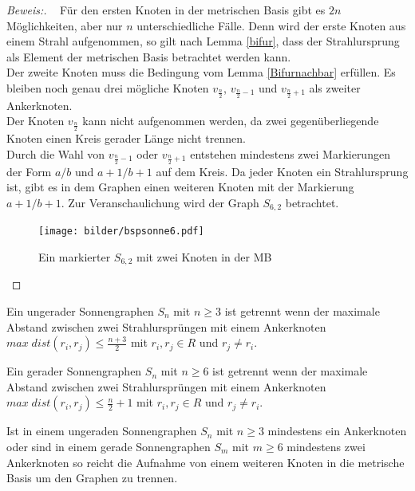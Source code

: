 \begin{proof}[Beweis:]~
Für den ersten Knoten in der metrischen Basis gibt es $2n$ Möglichkeiten, aber nur $n$ unterschiedliche Fälle. Denn wird der erste Knoten aus einem Strahl aufgenommen, so gilt nach Lemma \ref{bifur}, dass der Strahlursprung als Element der metrischen Basis betrachtet werden kann.\\
Der zweite Knoten muss die Bedingung vom Lemma \ref{Bifurnachbar} erfüllen. Es bleiben noch genau drei mögliche Knoten $v_{\frac{n}{2}}$, $v_{\frac{n}{2}-1}$ und $v_{\frac{n}{2}+1}$ als zweiter Ankerknoten.\\ 
Der Knoten $v_{\frac{n}{2}}$ kann nicht aufgenommen werden, da zwei gegenüberliegende Knoten einen Kreis gerader Länge nicht trennen.\\
Durch die Wahl von $v_{\frac{n}{2}-1}$ oder $v_{\frac{n}{2}+1}$ entstehen mindestens zwei Markierungen der Form $a/b$ und $a+1/b+1$ auf dem Kreis. Da jeder Knoten ein Strahlursprung ist, gibt es in dem Graphen einen weiteren Knoten mit der Markierung $a+1/b+1$. Zur Veranschaulichung wird der Graph $S_{6,2}$ betrachtet.
\begin{figure}[h!]
		\centering
 		 \texttt{[image: bilder/bspsonne6.pdf]}
   \caption{Ein markierter $S_{6,2}$ mit zwei Knoten in der MB}
  	 \end{figure}
\end{proof}
\begin{lem}
\label{ungerade_sonne}
Ein ungerader Sonnengraphen $S_n$ mit $n\geq 3$ ist getrennt wenn der maximale Abstand zwischen zwei Strahlursprüngen mit einem Ankerknoten $max\;dist(r_i,r_j)\leq \frac{n+3}{2}$ mit $r_i,r_j \in R$ und $r_j\neq r_i$.
\end{lem}

\begin{lem}
\label{gerade_sonne}
Ein gerader Sonnengraphen $S_n$ mit $n\geq 6$ ist getrennt wenn der maximale Abstand zwischen zwei Strahlursprüngen mit einem Ankerknoten $max\;dist(r_i,r_j)\leq \frac{n}{2}+1$ mit $r_i,r_j \in R$ und $r_j\neq r_i$.
\end{lem}
\begin{lem}
Ist in einem ungeraden Sonnengraphen $S_n$ mit $n\geq 3$ mindestens ein Ankerknoten oder sind in einem gerade Sonnengraphen $S_m$ mit $m\geq 6$ mindestens zwei Ankerknoten so reicht die Aufnahme von einem weiteren Knoten in die metrische Basis um den Graphen zu trennen. 
\end{lem}

